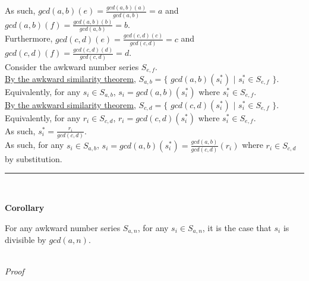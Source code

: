 \documentclass[a4paper,12pt]{article}
\begin{document}
\noindent As such, $gcd(a,b)(e) = \frac{gcd(a,b)(a)}{gcd(a,b)} = a$ and $gcd(a,b)(f) = \frac{gcd(a,b)(b)}{gcd(a,b)} = b$.\\

\noindent Furthermore, $gcd(c,d)(e) = \frac{gcd(c,d)(c)}{gcd(c,d)} = c$ and $gcd(c,d)(f) = \frac{gcd(c,d)(d)}{gcd(c,d)} = d$.\\

\noindent Consider the awkward number series $S_{e, f}$.\\

\noindent \hyperlink{theorem:awkward_similarity_theorem}{By the awkward similarity theorem}, $S_{a, b} = \{$ $gcd(a,b)(s^*_i)$ $|$ $s^*_i \in S_{e,f}$ $\}$.\\

\noindent Equivalently, for any $s_i \in S_{a,b}$, $s_i = gcd(a,b)(s^*_i)$ where $s^*_i \in S_{e,f}$.\\

\noindent \hyperlink{theorem:awkward_similarity_theorem}{By the awkward similarity theorem}, $S_{c, d} = \{$ $gcd(c,d)(s^*_i)$ $|$ $s^*_i \in S_{e,f}$ $\}$.\\

\noindent Equivalently, for any $r_i \in S_{c,d}$, $r_i = gcd(c,d)(s^*_i)$ where $s^*_i \in S_{e,f}$.\\

\noindent As such, $s^*_i = \frac{r_i}{gcd(c,d)}$.\\

\noindent As such, for any $s_i \in S_{a,b}$, $s_i = gcd(a,b)(s^*_i) = \frac{gcd(a,b)}{gcd(c,d)}(r_i)$ where $r_i \in S_{c,d}$ by substitution.

\begin{center}
\noindent\rule{8cm}{0.4pt}
\end{center}
\noindent \\








\label{corollary:divisible_by_gcd}
\hypertarget{definition:redundancy_divisible_by_gcd}{}
\begin{tcolorbox}
\textbf{Corollary}

For any awkward number series $S_{a,n}$, for any $s_i \in S_{a, n}$, it is the case that $s_i$ is divisible by $gcd(a,n)$.

\end{tcolorbox}

\noindent \\
\textit{Proof}
\end{document}
